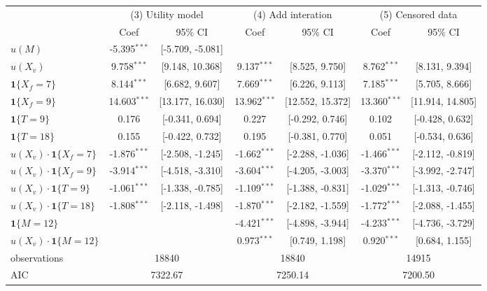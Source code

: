 \begin{tabular}{lcccccc}
  \hline
   & \multicolumn{2}{c}{(3) Utility model} & \multicolumn{2}{c}{(4) Add interation} & \multicolumn{2}{c}{(5) Censored data} \\ & Coef & 95\% CI & Coef & 95\% CI & Coef & 95\% CI \\ \hline
$u(M)$ & -5.395$^{***}$ & [-5.709, -5.081] &  &  &  &  \\ 
  $u(X_v)$ & 9.758$^{***}$ & [9.148, 10.368] & 9.137$^{***}$ & [8.525, 9.750] & 8.762$^{***}$ & [8.131, 9.394] \\ 
  $\textbf{1}\{X_f = 7\}$ & 8.144$^{***}$ & [6.682, 9.607] & 7.669$^{***}$ & [6.226, 9.113] & 7.185$^{***}$ & [5.705, 8.666] \\ 
  $\textbf{1}\{X_f = 9\}$ & 14.603$^{***}$ & [13.177, 16.030] & 13.962$^{***}$ & [12.552, 15.372] & 13.360$^{***}$ & [11.914, 14.805] \\ 
  $\textbf{1}\{T = 9\}$ & 0.176 & [-0.341, 0.694] & 0.227 & [-0.292, 0.746] & 0.102 & [-0.428, 0.632] \\ 
  $\textbf{1}\{T = 18\}$ & 0.155 & [-0.422, 0.732] & 0.195 & [-0.381, 0.770] & 0.051 & [-0.534, 0.636] \\ 
  $u(X_v)\cdot\textbf{1}\{X_f = 7\}$ & -1.876$^{***}$ & [-2.508, -1.245] & -1.662$^{***}$ & [-2.288, -1.036] & -1.466$^{***}$ & [-2.112, -0.819] \\ 
  $u(X_v)\cdot\textbf{1}\{X_f = 9\}$ & -3.914$^{***}$ & [-4.518, -3.310] & -3.604$^{***}$ & [-4.205, -3.003] & -3.370$^{***}$ & [-3.992, -2.747] \\ 
  $u(X_v)\cdot\textbf{1}\{T = 9\}$ & -1.061$^{***}$ & [-1.338, -0.785] & -1.109$^{***}$ & [-1.388, -0.831] & -1.029$^{***}$ & [-1.313, -0.746] \\ 
  $u(X_v)\cdot\textbf{1}\{T = 18\}$ & -1.808$^{***}$ & [-2.118, -1.498] & -1.870$^{***}$ & [-2.182, -1.559] & -1.772$^{***}$ & [-2.088, -1.455] \\ 
  $\textbf{1}\{M = 12\}$ &  &  & -4.421$^{***}$ & [-4.898, -3.944] & -4.233$^{***}$ & [-4.736, -3.729] \\ 
  $u(X_v)\cdot\textbf{1}\{M = 12\}$ &  &  & 0.973$^{***}$ & [0.749, 1.198] & 0.920$^{***}$ & [0.684, 1.155] \\ 
   \hline observations & \multicolumn{2}{c}{18840} & \multicolumn{2}{c}{18840} & \multicolumn{2}{c}{14915} \\ AIC & \multicolumn{2}{c}{7322.67} & \multicolumn{2}{c}{7250.14} & \multicolumn{2}{c}{7200.50} \\ \hline
\end{tabular}

